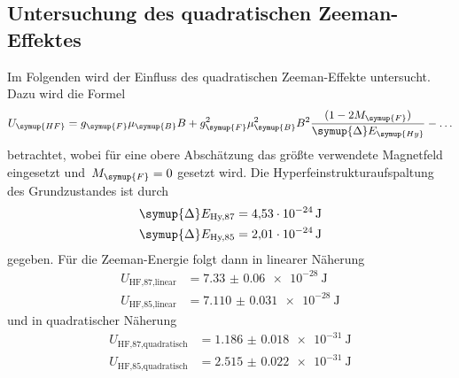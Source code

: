 \subsection{Untersuchung des quadratischen Zeeman-Effektes}
Im Folgenden wird der Einfluss des quadratischen Zeeman-Effekte untersucht. Dazu
wird die Formel
%
\begin{equation}
  U_{\symup{HF}}=g_{\symup{F}}\mu_{\symup{B}}B
  +g_{\symup{F}}^2\mu_{\symup{B}}^2B^2
  \frac{(1-2M_{\symup{F}})}{\symup{\Delta}E_{\symup{Hy}}}-\ldots
  \label{eq:zeemanenergie}
\end{equation}
%
betrachtet, wobei für eine obere Abschätzung das größte verwendete Magnetfeld
eingesetzt und~$M_{\symup{F}}=0$ gesetzt wird. Die Hyperfeinstrukturaufspaltung
des Grundzustandes ist durch
%
\begin{align}
  \symup{\Delta}E_{\text{Hy,87}}&=\SI{4.53e-24}{\joule} \\
  \symup{\Delta}E_{\text{Hy,85}}&=\SI{2.01e-24}{\joule}
\end{align}
%
gegeben. Für die Zeeman-Energie folgt dann in linearer Näherung
%
\begin{align}
  U_{\text{HF,87,linear}}&=\SI{7.33(6)e-28}{\joule} \\
  U_{\text{HF,85,linear}}&=\SI{7.110(31)e-28}{\joule}
\end{align}
%
und in quadratischer Näherung
%
\begin{align}
  U_{\text{HF,87,quadratisch}}&=\SI{1.186(18)e-31}{\joule} \\
  U_{\text{HF,85,quadratisch}}&=\SI{2.515(22)e-31}{\joule}
\end{align}
%
